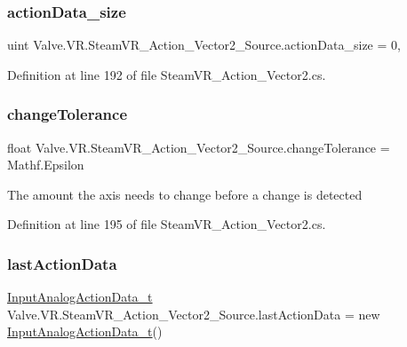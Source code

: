 \subsubsection{\texorpdfstring{actionData\_size}{actionData\_size}}
{\footnotesize\ttfamily uint Valve.\+V\+R.\+Steam\+V\+R\+\_\+\+Action\+\_\+\+Vector2\+\_\+\+Source.\+action\+Data\+\_\+size = 0\hspace{0.3cm}{\ttfamily [static]}, {\ttfamily [protected]}}



Definition at line 192 of file Steam\+V\+R\+\_\+\+Action\+\_\+\+Vector2.\+cs.

\mbox{\label{class_valve_1_1_v_r_1_1_steam_v_r___action___vector2___source_a088f2711ca529c91f7f88a680e1fb2c5}} 
\subsubsection{\texorpdfstring{changeTolerance}{changeTolerance}}
{\footnotesize\ttfamily float Valve.\+V\+R.\+Steam\+V\+R\+\_\+\+Action\+\_\+\+Vector2\+\_\+\+Source.\+change\+Tolerance = Mathf.\+Epsilon}



The amount the axis needs to change before a change is detected 



Definition at line 195 of file Steam\+V\+R\+\_\+\+Action\+\_\+\+Vector2.\+cs.

\mbox{\label{class_valve_1_1_v_r_1_1_steam_v_r___action___vector2___source_a249b038190420f6170b534360c64b9b1}} 
\subsubsection{\texorpdfstring{lastActionData}{lastActionData}}
{\footnotesize\ttfamily \mbox{\hyperlink{struct_valve_1_1_v_r_1_1_input_analog_action_data__t}{Input\+Analog\+Action\+Data\+\_\+t}} Valve.\+V\+R.\+Steam\+V\+R\+\_\+\+Action\+\_\+\+Vector2\+\_\+\+Source.\+last\+Action\+Data = new \mbox{\hyperlink{struct_valve_1_1_v_r_1_1_input_analog_action_data__t}{Input\+Analog\+Action\+Data\+\_\+t}}()\hspace{0.3cm}{\ttfamily [protected]}}




